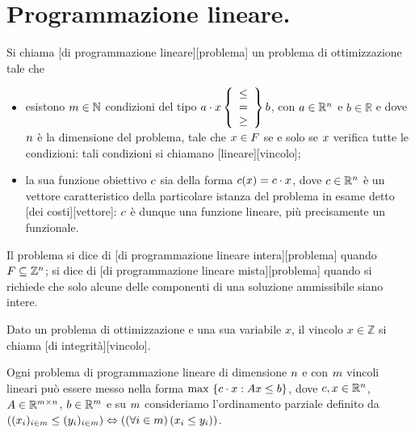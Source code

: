 \section{Programmazione lineare.}\label{ProgrammazioneLineare}
\begin{Definition}
	Si chiama
	[di programmazione lineare][problema]
	un problema di ottimizzazione tale che
	\begin{itemize}
		\item esistono $m \in \mathbb{N}$ condizioni del tipo $a \cdot x \left \lbrace \begin{array}{c} \leq\\=\\\geq \end{array} \right \rbrace b$, con $a \in \mathbb{R}^n$ e $b \in \mathbb{R}$ e dove $n$ \`e la dimensione del problema, tale che $x \in F$ se e solo se $x$ verifica tutte le condizioni: tali condizioni si chiamano [lineare][vincolo];
		\item la sua funzione obiettivo $c$ sia della forma
		$c(x) = c \cdot x$, dove $c \in \mathbb{R}^n$ \`e un vettore caratteristico della particolare istanza del problema in esame detto [dei costi][vettore]: $c$ \`e dunque una funzione lineare, pi\`u precisamente un funzionale.
	\end{itemize}
	Il problema si dice di [di programmazione lineare intera][problema] quando $F \subseteq \mathbb{Z}^n$; si dice di [di programmazione lineare mista][problema] quando si richiede che solo alcune delle componenti di una soluzione ammissibile siano intere.
\end{Definition}
\begin{Definition}
	Dato un problema di ottimizzazione e una sua variabile $x$, il vincolo $x \in \mathbb{Z}$ si chiama [di integrit\`a][vincolo].
\end{Definition}
\begin{Theorem}
	Ogni problema di programmazione lineare di dimensione $n$ e con $m$ vincoli lineari pu\`o essere messo nella forma $\max\ \lbrace c \cdot x : Ax \leq b \rbrace$, dove $c,x \in \mathbb{R}^n$, $A \in \mathbb{R}^{m \times n}$, $b \in \mathbb{R}^m$ e su $m$ consideriamo l'ordinamento parziale definito da $\left ( (x_i)_{i \in m} \leq (y_i)_{i \in m} \right ) \Leftrightarrow \left ( \left ( \forall i \in m \right ) \left ( x_i \leq y_i \right ) \right )$.
\end{Theorem}
